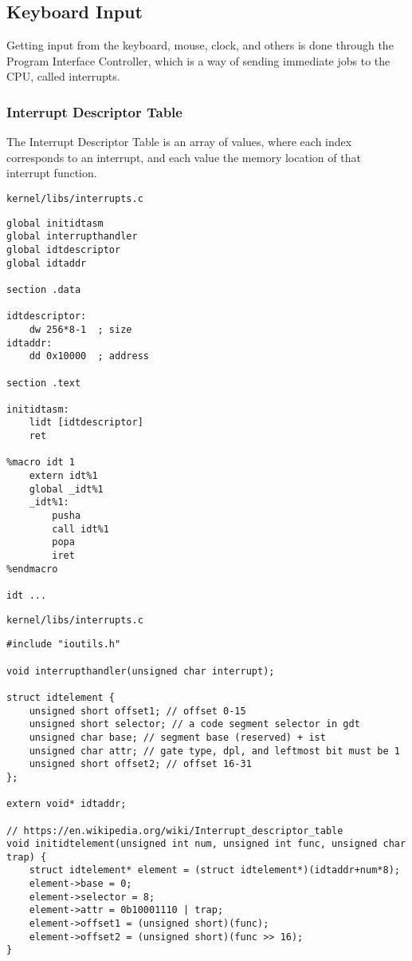 \documentclass{article}
\begin{document}
\subsection{Keyboard Input}

Getting input from the keyboard, mouse, clock, and others is done
through the Program Interface Controller, which is a way of sending
immediate jobs to the CPU, called interrupts.

\subsubsection{Interrupt Descriptor Table}

The Interrupt Descriptor Table\cite{lidt} is an array of values,
where each index corresponds to an interrupt, and each value the
memory location of that interrupt function.

\begin{verbatim}
kernel/libs/interrupts.c
\end{verbatim}
\begin{verbatim}
global initidtasm
global interrupthandler
global idtdescriptor
global idtaddr

section .data

idtdescriptor:
	dw 256*8-1	; size
idtaddr:
	dd 0x10000	; address

section .text

initidtasm:
	lidt [idtdescriptor]
	ret

%macro idt 1
	extern idt%1
	global _idt%1
	_idt%1:
		pusha
		call idt%1
		popa
		iret
%endmacro

idt ...
\end{verbatim}

\begin{verbatim}
kernel/libs/interrupts.c
\end{verbatim}
\begin{verbatim}
#include "ioutils.h"

void interrupthandler(unsigned char interrupt);

struct idtelement {
	unsigned short offset1; // offset 0-15
	unsigned short selector; // a code segment selector in gdt
	unsigned char base; // segment base (reserved) + ist
	unsigned char attr; // gate type, dpl, and leftmost bit must be 1
	unsigned short offset2; // offset 16-31
};

extern void* idtaddr;

// https://en.wikipedia.org/wiki/Interrupt_descriptor_table
void initidtelement(unsigned int num, unsigned int func, unsigned char trap) {
	struct idtelement* element = (struct idtelement*)(idtaddr+num*8);
	element->base = 0;
	element->selector = 8;
	element->attr = 0b10001110 | trap;
	element->offset1 = (unsigned short)(func);
	element->offset2 = (unsigned short)(func >> 16);
}
\end{verbatim}
\end{document}
